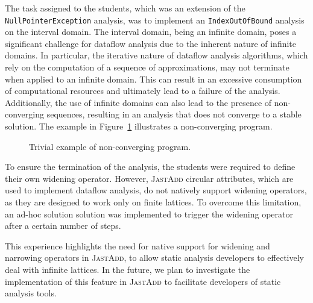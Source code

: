 The task assigned to the students, which was an extension of the \texttt{NullPointerException}
analysis, was to implement an \texttt{IndexOutOfBound} analysis on the interval domain. 
The interval domain, being an infinite domain, poses a significant challenge for
dataflow analysis due to the inherent nature of infinite domains. In particular,
the iterative nature of dataflow analysis algorithms, which rely on the computation
of a sequence of approximations, may not terminate when applied to an infinite domain.
This can result in an excessive consumption of computational resources and ultimately
lead to a failure of the analysis. Additionally, the use of infinite domains can also
lead to the presence of non-converging sequences, resulting in an analysis that does
not converge to a stable solution. The example in Figure~\ref{fig:nonConverging}
illustrates a non-converging program.
\begin{figure}
	\centering
	\caption{\label{fig:nonConverging} Trivial example of non-converging program.}
\end{figure}

To ensure the termination of the analysis, the students were required to 
define their own widening operator.
However, \textsc{JastAdd} circular attributes, which are used to implement dataflow 
analysis, do not natively support widening operators, as they are designed 
to work only on finite lattices. To overcome this limitation, an ad-hoc solution 
solution was implemented to trigger the widening operator after a certain 
number of steps.

This experience highlights the need for native support for widening and narrowing 
operators in \textsc{JastAdd}, to allow static analysis developers to effectively deal with 
infinite lattices. In the future, we plan to investigate the implementation of this 
feature in \textsc{JastAdd} to facilitate developers of static analysis tools.



